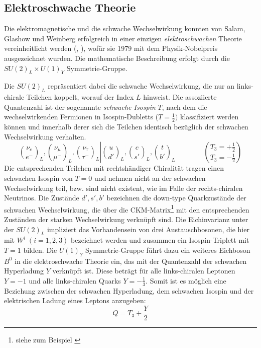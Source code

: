 \subsection{Elektroschwache Theorie}
\label{theory:electroweak}
Die elektromagnetische und die schwache Wechselwirkung konnten von Salam,
Glashow und Weinberg erfolgreich in einer einzigen \textit{elektroschwachen}
Theorie vereinheitlicht werden (\cite{Glashow:1961tr}, \cite{Weinberg:1967tq}),
wofür sie 1979 mit dem Physik-Nobelpreis ausgezeichnet wurden. Die
mathematische Beschreibung erfolgt durch die $SU(2)_L \times U(1)_Y$
Symmetrie-Gruppe.

Die $SU(2)_L$ repräsentiert dabei die schwache Wechselwirkung, die nur an
links-chirale Teilchen koppelt, worauf der Index $L$ hinweist. Die assoziierte
Quantenzahl ist der sogenannte \textit{schwache Isospin} $T$, nach dem die
wechselwirkenden Fermionen in Isospin-Dubletts ($T=\frac{1}{2})$ klassifiziert
werden können und innerhalb derer sich die Teilchen identisch bezüglich der
schwachen Wechselwirkung verhalten.
\begin{equation*}
    \left.
    \binom{\nu_e}{e^-}_L , \binom{\nu_\mu}{\mu^-}_L ,
    \binom{\nu_\tau}{\tau^-}_L
    \right|
    \binom{u}{d'}_L , \binom{c}{s'}_L , \binom{t}{b'}_L 
    \qquad\qquad
    \binom{T_3 = +\frac{1}{2}}{T_3 = -\frac{1}{2}}
\end{equation*}
Die entsprechenden Teilchen mit rechtshändiger Chiralität tragen einen
schwachen Isospin von $T=0$ und nehmen nicht an der schwachen Wechselwirkung
teil, bzw. sind nicht existent, wie im Falle der rechts-chiralen Neutrinos. Die
Zustände $d',s',b'$ bezeichnen die down-type Quarkzustände der schwachen
Wechselwirkung, die über die CKM-Matrix\footnote{siehe zum Beispiel 
\cite{PhysRevD.86.010001}} mit den entsprechenden Zuständen der starken
Wechselwirkung verknüpft sind. Die Eichinvarianz unter der $SU(2)_L$ impliziert
das Vorhandensein von drei Austauschbosonen, die hier mit $W^i\; (i=1,2,3)$
bezeichnet werden und zusammen ein Isospin-Triplett mit $T=1$ bilden. Die
$U(1)_Y$ Symmetrie-Gruppe führt dazu ein weiteres Eichboson $B^0$ in die
elektroschwache Theorie ein, das mit der Quantenzahl der schwachen Hyperladung
$Y$ verknüpft ist. Diese beträgt für alle links-chiralen Leptonen $Y=-1$ und
alle links-chiralen Quarks $Y=-\frac{1}{3}$. Somit ist es möglich eine
Beziehung zwischen der schwachen Hyperladung, dem schwachen Isospin und der
elektrischen Ladung eines Leptons anzugeben:
\begin{equation}
    Q = T_3 + \frac{Y}{2}
    \label{eq:charge_relation}
\end{equation}

